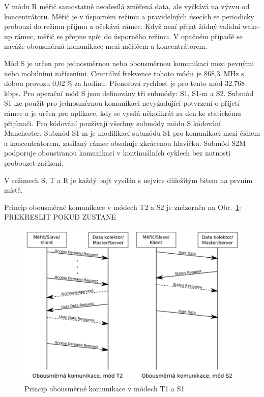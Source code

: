V	módu R měřič samostatně neodesílá změřená data, ale vyčkává na výzvu od koncentrátoru. Měřič je v úsporném režimu a pravidelných úsecích se periodicky probouzí do režimu přijmu a očekává rámec. Když není přijat žádný validní wake-up rámec, měřič se přepne zpět do úsporného režimu. V	opačném případě se naváže obousměrná komunikace mezi měřičem a koncentrátorem.


Mód S je určen pro jednosměrnou nebo obousměrnou komunikaci mezi pevnými nebo mobilními zařízeními. Centrální frekvence tohoto módu je 868,3\, MHz s dobou provozu 0,02\,\% za hodinu. Přenosová rychlost je pro tento mód 32,768\,kbps. Pro operační mód S jsou definovány tři submódy: S1, S1-m a S2. Submód S1 lze použít pro jednosměrnou komunikaci nevyžadující potvrzení o přijetí rámce a je určen pro aplikace, kdy se vysílá několikrát za den ke statickému přijímači. Pro kódování používají všechny submódy módu S kódování Manchester.  
Submód S1-m je modifikací submódu S1 pro komunikaci mezi čidlem a koncentrátorem, zasílaný rámec obsahuje zkrácenou hlavičku.
Submód S2M podporuje oboustranou komunikaci v kontinuálních cyklech bez nutnosti probouzet zařízení.

V režimech S, T a R je každý bajt vysílán s nejvíce důležitým bitem na prvním místě.


Princip obousměrné komunikace v módech T2 a S2 je znázorněn na Obr.~\ref{ObrazekObousmerny}:
\colorbox[rgb]{1,0,0}{PREKRESLIT POKUD ZUSTANE} 

\begin{figure}[!ht]
 \begin{center}
    \includegraphics[scale=0.8]{obrazky/wmbus_obousmerne}
  \end{center}
  \caption{Princip obousměrné komunikace v módech T1 a S1}
	\label{ObrazekObousmerny}
\end{figure}


